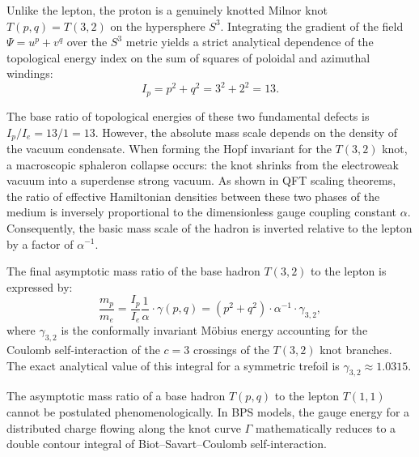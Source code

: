 \documentclass[11pt,a4paper]{article}
\begin{document}
Unlike the lepton, the proton is a genuinely knotted Milnor knot $T(p,q) = T(3,2)$ on the hypersphere $S^3$. Integrating the gradient of the field $\Psi = u^p + v^q$ over the $S^3$ metric yields a strict analytical dependence of the topological energy index on the sum of squares of poloidal and azimuthal windings:
\begin{equation}
I_p = p^2 + q^2 = 3^2 + 2^2 = 13.
\end{equation}

The base ratio of topological energies of these two fundamental defects is $I_p / I_e = 13 / 1 = 13$.
However, the absolute mass scale depends on the density of the vacuum condensate. When forming the Hopf invariant for the $T(3,2)$ knot, a macroscopic sphaleron collapse occurs: the knot shrinks from the electroweak vacuum into a superdense strong vacuum. As shown in QFT scaling theorems, the ratio of effective Hamiltonian densities between these two phases of the medium is inversely proportional to the dimensionless gauge coupling constant $\alpha$. Consequently, the basic mass scale of the hadron is inverted relative to the lepton by a factor of $\alpha^{-1}$.

The final asymptotic mass ratio of the base hadron $T(3,2)$ to the lepton is expressed by:
\begin{equation}
\frac{m_p}{m_e} = \frac{I_p}{I_e} \frac{1}{\alpha} \cdot \gamma(p,q) = (p^2 + q^2) \cdot \alpha^{-1} \cdot \gamma_{3,2},
\label{eq:mass_ratio_proton}
\end{equation}
where $\gamma_{3,2}$ is the conformally invariant Möbius energy accounting for the Coulomb self-interaction of the $c = 3$ crossings of the $T(3,2)$ knot branches. The exact analytical value of this integral for a symmetric trefoil is $\gamma_{3,2} \approx 1.0315$.

The asymptotic mass ratio of a base hadron $T(p,q)$ to the lepton $T(1,1)$ cannot be postulated phenomenologically. In BPS models, the gauge energy for a distributed charge flowing along the knot curve $\Gamma$ mathematically reduces to a double contour integral of Biot–Savart–Coulomb self-interaction.
\end{document}
